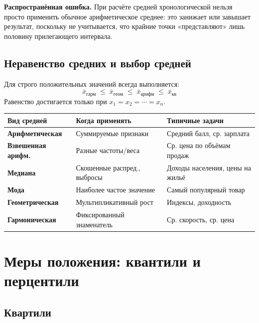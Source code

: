 \documentclass[a4paper]{article}
\begin{document}
\textbf{Распространённая ошибка.} При расчёте средней хронологической нельзя
просто применить обычное арифметическое среднее: это занижает или завышает
результат, поскольку не учитывается, что крайние точки «представляют» лишь
половину прилегающего интервала.

\subsection{Неравенство средних и выбор средней}

Для строго положительных значений всегда выполняется:
\[
\bar{x}_{гарм} \;\leq\; \bar{x}_{геом} \;\leq\; \bar{x}_{арифм} \;\leq\; \bar{x}_{кв}
\]
Равенство достигается только при $x_1 = x_2 = \cdots = x_n$.

\bigskip
\begin{center}
	\renewcommand{\arraystretch}{1.4}
	\begin{tabular}{>{\bfseries}p{3.3cm} p{4.2cm} p{5cm}}
		\toprule
		Вид средней & Когда применять & Типичные задачи \\
		\midrule
		Арифметическая & Суммируемые признаки & Средний балл, ср. зарплата \\
		Взвешенная арифм. & Разные частоты/веса & Ср. цена по объёмам продаж \\
		Медиана & Скошенные распред., выбросы & Доходы населения, цены на жильё \\
		Мода & Наиболее частое значение & Самый популярный товар \\
		Геометрическая & Мультипликативный рост & Индексы, доходность \\
		Гармоническая & Фиксированный знаменатель & Ср. скорость, ср. цена \\
		\bottomrule
	\end{tabular}
\end{center}

\section{Меры положения: квантили и перцентили}
\subsection{Квартили}
\end{document}
